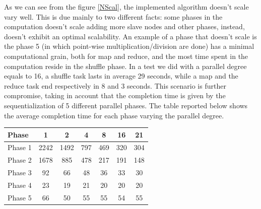 As we can see from the figure \ref{NScal}, the implemented algorithm doesn't scale vary well. This is due mainly to two different facts: some phases in the computation doesn't scale adding more slave nodes and other phases, instead, doesn't exhibit an optimal scalability. An example of a phase that doesn't scale is the phase 5 (in which point-wise multiplication/division are done) has a minimal computational grain, both for map and reduce, and the most time spent in the computation reside in the shuffle phase. In a test we did with a parallel degree equals to 16, a shuffle task lasts in average 29 seconds, while a map and the reduce task end respectively in 8 and 3 seconds. This scenario is further compromise, taking in account that the completion time is given by the sequentialization of 5 different parallel phases. %
The table reported below shows the average completion time for each phase varying the parallel degree.

\begin{center}
\begin{tabular}{ | l || c | c | c | c |  c | c | }
  \hline      
  Phase & 1 & 2 & 4 & 8 &16 & 21 \\
  \hline      
  Phase 1 & 2242 	& 1492 & 797 	& 469 	& 320 	& 304\\
  Phase 2 & 1678 	& 885 	& 478	& 217 	& 191 	& 148\\
  Phase 3 & 92 		& 66 	& 48 	& 36 	& 33 	& 30\\ 
  Phase 4 & 23 		& 19 	& 21 	& 20 	& 20 	& 20\\
  Phase 5 & 66 		& 50 	& 55 	& 55 	& 54 	& 55\\
  \hline  
\end{tabular} 
\end{center}





